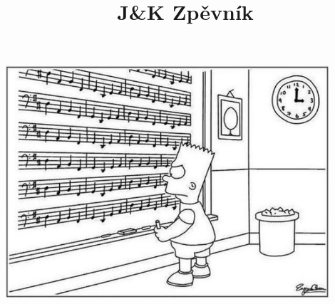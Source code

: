 \documentclass[11pt]{article}
\title{\Huge{J\&K Zpěvník}}
\author{\sc{Jakub Komárek \& Jiří Blaha}}
\date{}
\begin{document}
	\maketitle
	\thispagestyle{empty}
	\includegraphics[width=0.9\textwidth]{cover}
	\newpage
	

	\begin{songs}{}%
	
	\end{songs}

\end{document}
